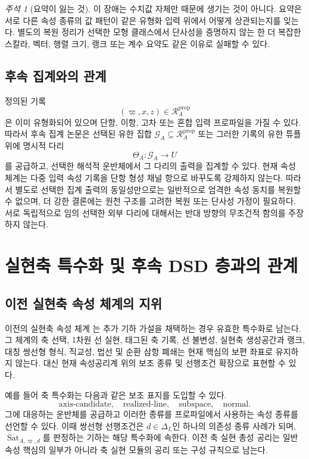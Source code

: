 \documentclass[11pt]{article}
\newcommand{\Dep}{\Delta_{L}}
\newcommand{\Sat}{\operatorname{Sat}}
\newcommand{\PropRec}{\mathcal R^{\mathrm{prop}}}
\theoremstyle{definition}
\theoremstyle{remark}
\newtheorem{remark}[theorem]{주석}
\begin{document}
\begin{remark}[요약이 잃는 것]
이 장애는 수치값 자체만 때문에 생기는 것이 아니다.
요약은 서로 다른 속성 종류의 값 패턴이 같은 유형화 입력 위에서 어떻게 상관되는지를 잊는다.
별도의 복원 정리가 선택한 모형 클래스에서 단사성을 증명하지 않는 한 더 복잡한 스칼라, 벡터, 행렬 크기, 랭크 또는 계수 요약도 같은 이유로 실패할 수 있다.
\end{remark}

\subsection{후속 집계와의 관계}

정의된 기록
\[
(\varpi,x,z)\in\PropRec_A
\]
은 이미 유형화되어 있으며 단항, 이항, 고차 또는 혼합 입력 프로파일을 가질 수 있다.
따라서 후속 집계 논문은 선택된 유한 집합 \(\mathcal G_A\subseteq\PropRec_A\) 또는 그러한 기록의 유한 튜플 위에 명시적 다리
\[
\Theta_A:\mathcal G_A\longrightarrow U
\]
를 공급하고, 선택한 해석적 운반체에서 그 다리의 출력을 집계할 수 있다.
현재 속성 체계는 다중 입력 속성 기록을 단항 형성 채널 항으로 바꾸도록 강제하지 않는다.
따라서 별도로 선택한 집계 출력의 동일성만으로는 일반적으로 엄격한 속성 동치를 복원할 수 없으며, 더 강한 결론에는 원천 구조를 고려한 복원 또는 단사성 가정이 필요하다.
서로 독립적으로 임의 선택한 외부 다리에 대해서는 반대 방향의 무조건적 함의를 주장하지 않는다.

\section{실현축 특수화 및 후속 DSD 층과의 관계}
\label{sec:specialization}

\subsection{이전 실현축 속성 체계의 지위}

이전의 실현축 속성 체계 \cite{KwonAxisProperty}는 추가 기하 가설을 채택하는 경우 유효한 특수화로 남는다.
그 체계의 축 선택, 1차원 선 실현, 태그된 축 기록, 선 불변성, 실현축 생성공간과 랭크, 대칭 쌍선형 형식, 직교성, 법선 및 순환 삼항 폐쇄는 현재 핵심의 보편 좌표로 유지하지 않는다.
대신 현재 속성공리계 위의 보조 종류 및 선행조건 확장으로 표현할 수 있다.

예를 들어 축 특수화는 다음과 같은 보조 표지를 도입할 수 있다.
\[
\mathrm{axis\mbox{-}candidate},\quad
\mathrm{realized\mbox{-}line},\quad
\mathrm{subspace},\quad
\mathrm{normal}.
\]
그에 대응하는 운반체를 공급하고 이러한 종류를 프로파일에서 사용하는 속성 종류를 선언할 수 있다.
이때 쌍선형 선행조건은 \(d\in\Dep\)인 하나의 의존성 종류 사례가 되며, \(\Sat_{A,\varpi,d}\)를 판정하는 기하는 해당 특수화에 속한다.
이전 축 실현 총성 공리는 일반 속성 핵심의 일부가 아니라 축 실현 모듈의 공리 또는 구성 규칙으로 남는다.
\end{document}
